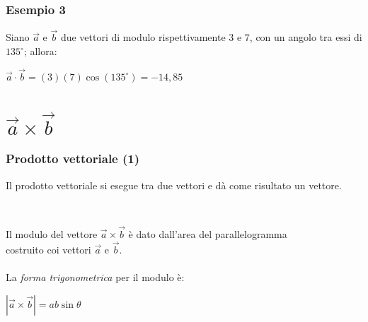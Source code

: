 \documentclass[]{beamer}
\begin{document}
\begin{frame}
  \frametitle{Esempio 3}


Siano $ \vec{a} $ e $ \vec{b} $ due vettori di modulo rispettivamente $ 3 $ e $ 7 $, con un angolo tra essi di $ 135^\circ $; allora:
\begin{center}
$ \vec{a} \cdot \vec{b} = (3)(7)\cos(135^\circ) = -14,85 $
\end{center}

\end{frame}





\section{$ \vec{a}\times\vec{b} $}

\begin{frame}
  \frametitle{Prodotto vettoriale (1)}
  Il prodotto vettoriale si esegue tra due vettori e dà come risultato un vettore.\pause~\\~
  
\begin{columns}
\begin{column}{0.5\textwidth}

Il \alert{modulo del vettore} $ \vec{a} \times \vec{b} $ è dato dall'area del parallelogramma costruito coi vettori $ \vec{a} $ e $ \vec{b} $.\\~\\La \emph{forma trigonometrica} per il modulo è:
\begin{center}
 \colorbox{marroncino!30}{$ | \vec{a} \times \vec{b} | = ab\sin\theta $}
 \end{center}


\end{column}
\begin{column}{0.5\textwidth}

\begin{figure}
\end{figure}

\end{column}
\end{columns}
\end{frame}
\end{document}
